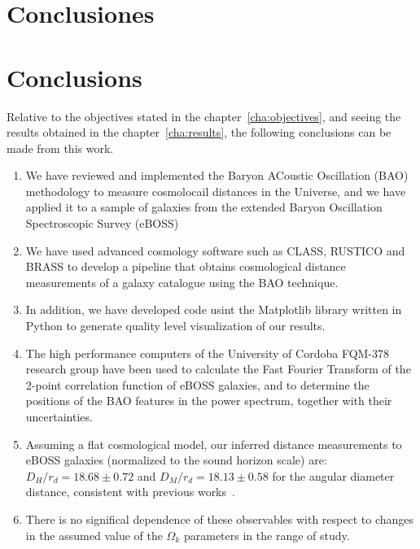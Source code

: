\chapter*{Conclusiones}


\chapter*{Conclusions}

Relative to the objectives stated in the chapter~\ref{cha:objectives}, and seeing the results obtained in the chapter~\ref{cha:results}, the following conclusions can be made from this work.

\begin{enumerate}
	\item We have reviewed and implemented the Baryon ACoustic Oscillation (BAO) methodology to measure cosmolocail distances in the Universe, and we have applied it to a sample of galaxies from the extended Baryon Oscillation Spectroscopic Survey (eBOSS)
	\item We have used advanced cosmology software such as CLASS, RUSTICO and BRASS to develop a pipeline that obtains cosmological distance measurements of a galaxy catalogue using the BAO technique.
	\item In addition, we have developed code usint the Matplotlib library written in Python to generate quality level visualization of our results.
	\item The high performance computers of the University of Cordoba FQM-378 research group have been used to calculate the Fast Fourier Transform of the 2-point correlation function of eBOSS galaxies, and to determine the positions of the BAO features in the power spectrum, together with their uncertainties.
	\item Assuming a flat cosmological model, our inferred distance measurements to eBOSS galaxies (normalized to the sound horizon scale) are: $D_H/r_d = 18.68 \pm 0.72$ and $D_M/r_d = 18.13 \pm 0.58$ for the angular diameter distance, consistent with previous works~\cite{hector}.
	\item There is no significal dependence of these observables with respect to changes in the assumed value of the $\Omega_k$ parameters in the range of study.
\end{enumerate}

